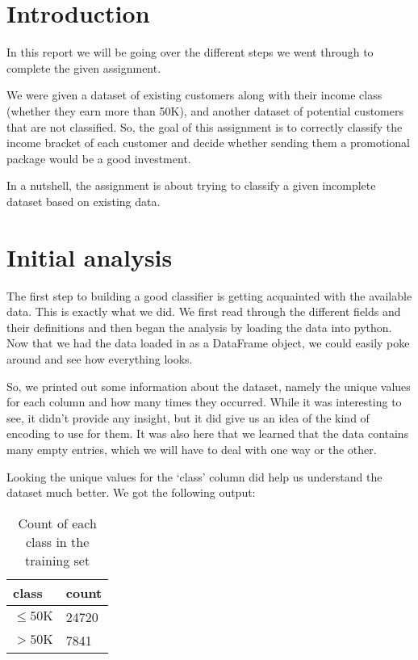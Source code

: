\documentclass{article}
\title{\textmd{\textbf{\subject}}\\\normalsize\vspace{0.1in}\Large{\assignmentname}}
\author{Mohammed Al-Ogaili - 20193575}
\date{2022 - 2023}
\begin{document}
\maketitle

\section{Introduction}
In this report we will be going over the different steps we went through to complete the given assignment.

We were given a dataset of existing customers along with their income class (whether they earn more than 50K), and another dataset of potential customers that are not classified. So, the goal of this assignment is to correctly classify the income bracket of each customer and decide whether sending them a promotional package would be a good investment.

In a nutshell, the assignment is about trying to classify a given incomplete dataset based on existing data.

\section{Initial analysis}
The first step to building a good classifier is getting acquainted with the available data. This is exactly what we did. We first read through the different fields and their definitions and then began the analysis by loading the data into python. Now that we had the data loaded in as a DataFrame object, we could easily poke around and see how everything looks.

So, we printed out some information about the dataset, namely the unique values for each column and how many times they occurred. While it was interesting to see, it didn't provide any insight, but it did give us an idea of the kind of encoding to use for them. It was also here that we learned that the data contains many empty entries, which we will have to deal with one way or the other.

Looking the unique values for the `class' column did help us understand the dataset much better. We got the following output:

\begin{table}[H]
    \centering\begin{tabular}{|l|l|}
        \hline
        class            & count \\ \hline
        $\le 50\text{K}$ & 24720 \\ \hline
        $>50\text{K}$ & 7841  \\ \hline
    \end{tabular}
    \caption{Count of each class in the training set}
    \label{unique_count}
\end{table}
\end{document}
